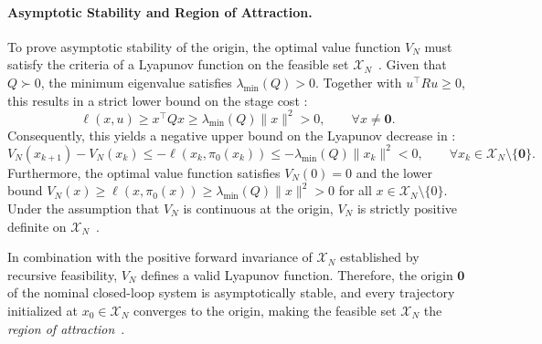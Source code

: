 \paragraph{Asymptotic Stability and Region of Attraction.}
To prove asymptotic stability of the origin, the optimal value function $V_N$ must satisfy the criteria of a 
Lyapunov function on the feasible set $\mathcal{X}_N$~. 
Given that $Q \succ 0$, the minimum eigenvalue satisfies $\lambda_{\min}(Q) > 0$. 
Together with $u^\top R u \geq 0$, this results in a strict lower bound on the stage cost :
\begin{equation}
    \label{eq:stage-cost-lower-bound}
    \ell(x, u) \geq x^\top Q x \geq \lambda_{\min}(Q) \|x\|^2 > 0, \qquad \forall x \neq \mathbf{0}.
\end{equation}
Consequently, this yields a negative upper bound on the Lyapunov decrease in :
\begin{equation}
    \label{eq:lyapunov-decrease-eigenvalue}
    V_N(x_{k+1}) - V_N(x_k) \leq -\ell(x_k, \pi_0(x_k)) \leq -\lambda_{\min}(Q) \|x_k\|^2 < 0, 
        \qquad \forall x_k \in \mathcal{X}_N \setminus \{\mathbf{0}\}.
\end{equation}
Furthermore, the optimal value function satisfies $V_N(0) = 0$ and the lower bound 
$V_N(x) \ge \ell(x, \pi_0(x)) \ge \lambda_{\min}(Q) \|x\|^2 > 0$ for all $x \in \mathcal{X}_N \setminus \{0\}$. 
Under the assumption that $V_N$ is continuous at the origin, $V_N$ is strictly positive definite on 
$\mathcal{X}_N$~.

In combination with the positive forward invariance of $\mathcal{X}_N$ established by recursive feasibility, 
$V_N$ defines a valid Lyapunov function. 
Therefore, the origin $\mathbf{0}$ of the nominal closed-loop system is asymptotically stable, and every 
trajectory initialized at $x_0 \in \mathcal{X}_N$ converges to the origin, making the feasible set $\mathcal{X}_N$ 
the \emph{region of attraction}~.